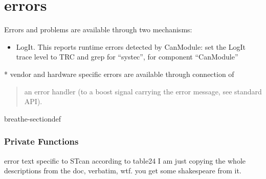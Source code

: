 \documentclass[a4paper,10pt,english]{sphinxmanual}
\begin{document}
\section{errors}
\label{\detokenize{vendors/systec:errors}}
\sphinxAtStartPar
Errors and problems are available through two mechanisms:
\begin{itemize}
\item {} 
\sphinxAtStartPar
LogIt. This reports runtime errors detected by CanModule:
set the LogIt trace level to TRC and grep for “systec”, for component “CanModule”

\end{itemize}

\sphinxAtStartPar
{}
* vendor and hardware specific errors are available through connection of
\begin{quote}

\sphinxAtStartPar
an error handler (to a boost signal carrying the error message, see standard API).
\end{quote}

\begin{fulllineitems}
%
\pysigstartmultiline
{}%
\pysigstopmultiline
\begin{sphinxuseclass}{breathe-sectiondef}\subsubsection*{Private Functions}

\begin{fulllineitems}
\label{\detokenize{vendors/systec:_CPPv4N9STCanScan17STcanGetErrorTextEl}}%
\pysigstartmultiline
{}%
\pysigstopmultiline
\sphinxAtStartPar
error text specific to STcan according to table24 I am just copying the whole descriptions from the doc, verbatim, wtf. you get some shakespeare from it. 

\end{fulllineitems}


\end{sphinxuseclass}
\end{fulllineitems}
\end{document}
